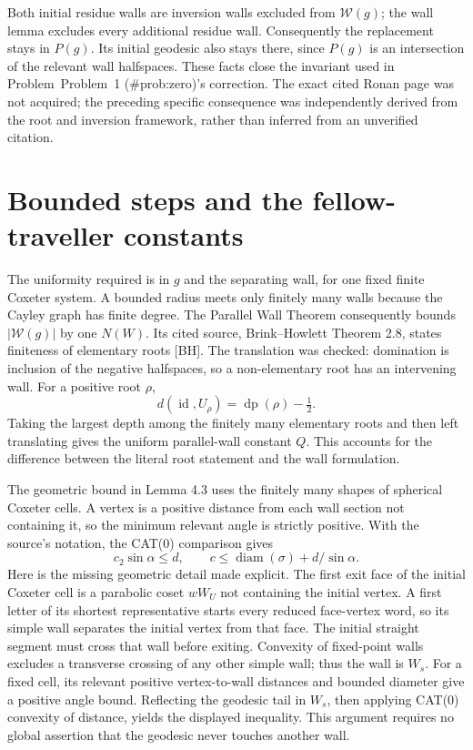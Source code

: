 \documentclass[10pt]{article}
\begin{document}
Both initial residue walls are inversion walls excluded from \(\mathcal W(g)\); the wall lemma excludes every additional residue wall. Consequently the replacement stays in \(P(g)\). Its initial geodesic also stays there, since \(P(g)\) is an intersection of the relevant wall halfspaces. These facts close the invariant used in Problem Problem 1 (\#prob:zero)’s correction. The exact cited Ronan page was not acquired; the preceding specific consequence was independently derived from the root and inversion framework, rather than inferred from an unverified citation.\par
\section*{Bounded steps and the fellow-traveller constants}
The uniformity required is in \(g\) and the separating wall, for one fixed finite Coxeter system. A bounded radius meets only finitely many walls because the Cayley graph has finite degree. The Parallel Wall Theorem consequently bounds \(|\mathcal W(g)|\) by one \(N(W)\). Its cited source, Brink–Howlett Theorem 2.8, states finiteness of elementary roots [BH]. The translation was checked: domination is inclusion of the negative halfspaces, so a non-elementary root has an intervening wall. For a positive root \(\rho\), \[d(\operatorname{id},U_\rho)=\operatorname{dp}(\rho)-\tfrac12.\] Taking the largest depth among the finitely many elementary roots and then left translating gives the uniform parallel-wall constant \(Q\). This accounts for the difference between the literal root statement and the wall formulation.\par
The geometric bound in Lemma 4.3 uses the finitely many shapes of spherical Coxeter cells. A vertex is a positive distance from each wall section not containing it, so the minimum relevant angle is strictly positive. With the source’s notation, the CAT(0) comparison gives \[c_2\sin\alpha\le d,\qquad
 c\le\operatorname{diam}(\sigma)+d/\sin\alpha .\] Here is the missing geometric detail made explicit. The first exit face of the initial Coxeter cell is a parabolic coset \(wW_U\) not containing the initial vertex. A first letter of its shortest representative starts every reduced face-vertex word, so its simple wall separates the initial vertex from that face. The initial straight segment must cross that wall before exiting. Convexity of fixed-point walls excludes a transverse crossing of any other simple wall; thus the wall is \(W_s\). For a fixed cell, its relevant positive vertex-to-wall distances and bounded diameter give a positive angle bound. Reflecting the geodesic tail in \(W_s\), then applying CAT(0) convexity of distance, yields the displayed inequality. This argument requires no global assertion that the geodesic never touches another wall.\par
\end{document}
